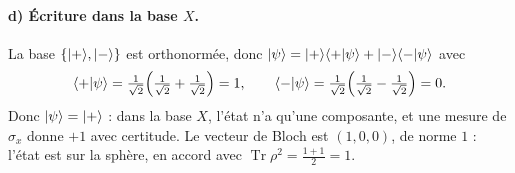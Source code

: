 \begin{correction}
\paragraph{d) Écriture dans la base $X$.} La base $\{|+\rangle,|-\rangle\}$ est orthonormée, donc
$|\psi\rangle=|+\rangle\langle +|\psi\rangle+|-\rangle\langle -|\psi\rangle$ avec
\[
  \langle +|\psi\rangle=\tfrac{1}{\sqrt2}\Big(\tfrac{1}{\sqrt2}+\tfrac{1}{\sqrt2}\Big)=1,
  \qquad
  \langle -|\psi\rangle=\tfrac{1}{\sqrt2}\Big(\tfrac{1}{\sqrt2}-\tfrac{1}{\sqrt2}\Big)=0 .
\]
Donc $|\psi\rangle=|+\rangle$ : dans la base $X$, l'état n'a qu'une composante, et une mesure de
$\sigma_x$ donne $+1$ avec certitude. Le vecteur de Bloch est $(1,0,0)$, de norme $1$ : l'état est
sur la sphère, en accord avec $\operatorname{Tr}\rho^2=\frac{1+1}{2}=1$.
\end{correction}

